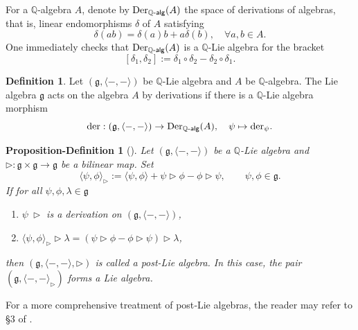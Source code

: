 \documentclass[11pt, a4paper]{amsart}
\newtheorem{propdef}[theorem]{Proposition-Definition}
\numberwithin{equation}{section}
\theoremstyle{definition}
\newtheorem{definition}[theorem]{Definition}
\newcommand{\Q}{\mathbb{Q}}
\begin{document}
For a $\Q$-algebra $A$, denote by $\mathrm{Der}_{\Q{\text-}\mathsf{alg}}(A)$ the space of derivations of algebras, that is, linear endomorphisms $\delta$ of $A$ satisfying
\[
    \delta(ab) = \delta(a) b + a \delta(b), \quad \forall a,b \in A.
\]
One immediately checks that $\mathrm{Der}_{\Q{\text-}\mathsf{alg}}(A)$ is a $\Q$-Lie algebra for the bracket
\[
    [\delta_1, \delta_2] := \delta_1 \circ \delta_2 - \delta_2 \circ \delta_1.
\]

\begin{definition}
    Let $(\mathfrak{g}, \langle-,-\rangle)$ be $\Q$-Lie algebra and $A$ be $\Q$-algebra. The Lie algebra $\mathfrak{g}$ acts on the algebra $A$ by derivations if there is a $\Q$-Lie algebra morphism
    \[
        \mathrm{der} : (\mathfrak{g}, \langle-,-\rangle) \to \mathrm{Der}_{\Q{\text-}\mathsf{alg}}(A), \quad \psi \mapsto \mathrm{der}_\psi.
    \]
\end{definition}

\begin{propdef}[{\cite[Proposition 2.2.]{elm}}]
Let $(\mathfrak{g}, \langle-,-\rangle)$ be a $\Q$-Lie algebra and $\triangleright : \mathfrak{g} \times \mathfrak{g} \to \mathfrak{g}$ be a bilinear map. Set
\begin{equation*} %
\langle \psi, \phi \rangle_\triangleright := \langle \psi, \phi \rangle + \psi \triangleright \phi - \phi \triangleright \psi,\qquad \psi,\phi\in\mathfrak{g}.
\end{equation*}
If for all $\psi,\phi,\lambda\in\mathfrak{g}$
\begin{enumerate}[label=(\roman*), leftmargin=*]
\item $\psi\ \triangleright$ is a derivation on $(\mathfrak{g}, \langle-,-\rangle)$, \label{post-lie1}
\item $\langle\psi,\phi\rangle_\triangleright \triangleright \lambda=(\psi\triangleright \phi-\phi\triangleright \psi)\triangleright \lambda$, \label{post-lie2}
\end{enumerate}
then $(\mathfrak{g},\langle-,-\rangle,\triangleright)$ is called a \emph{post-Lie algebra}. In this case, the pair $(\mathfrak{g}, \langle-,-\rangle_\triangleright)$ forms a Lie algebra. \label{propdef:post-Lie}
\end{propdef}

For a more comprehensive treatment of post‑Lie algebras, the reader may refer to §3 of \cite{BCK23}.
\end{document}

